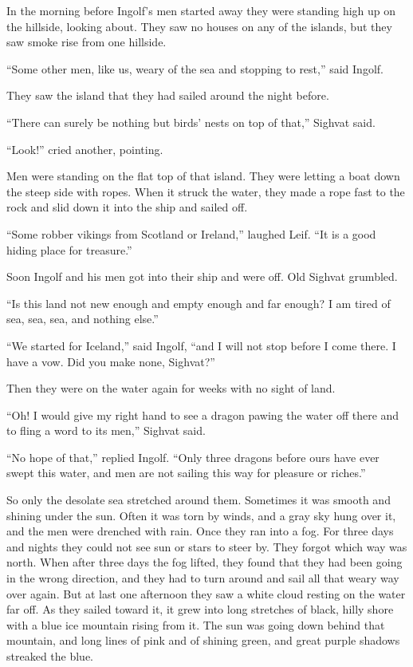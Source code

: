 In the morning before Ingolf's men started away they were standing high
up on the hillside, looking about. They saw no houses on any of the
islands, but they saw smoke rise from one hillside.

``Some other men, like us, weary of the sea and stopping to rest,'' said
Ingolf.

They saw the island that they had sailed around the night before.

``There can surely be nothing but birds' nests on top of that,'' Sighvat
said.

``Look!'' cried another, pointing.

Men were standing on the flat top of that island. They were letting a
boat down the steep side with ropes. When it struck the water, they made
a rope fast to the rock and slid down it into the ship and sailed off.

``Some robber vikings from Scotland or Ireland,'' laughed Leif. ``It is
a good hiding place for treasure.''

Soon Ingolf and his men got into their ship and were off. Old Sighvat
grumbled.

``Is this land not new enough and empty enough and far enough? I am
tired of sea, sea, sea, and nothing else.''

``We started for Iceland,'' said Ingolf, ``and I will not stop before I
come there. I have a vow. Did you make none, Sighvat?''

Then they were on the water again for weeks with no sight of land.

``Oh! I would give my right hand to see a dragon pawing the water off
there and to fling a word to its men,'' Sighvat said.

``No hope of that,'' replied Ingolf. ``Only three dragons before ours
have ever swept this water, and men are not sailing this way for
pleasure or riches.''

So only the desolate sea stretched around them. Sometimes it was smooth
and shining under the sun. Often it was torn by winds, and a gray sky
hung over it, and the men were drenched with rain. Once they ran into a
fog. For three days and nights they could not see sun or stars to steer
by. They forgot which way was north. When after three days the fog
lifted, they found that they had been going in the wrong direction, and
they had to turn around and sail all that weary way over again. But at
last one afternoon they saw a white cloud resting on the water far off.
As they sailed toward it, it grew into long stretches of black, hilly
shore with a blue ice mountain rising from it. The sun was going down
behind that mountain, and long lines of pink and of shining green, and
great purple shadows streaked the blue.

